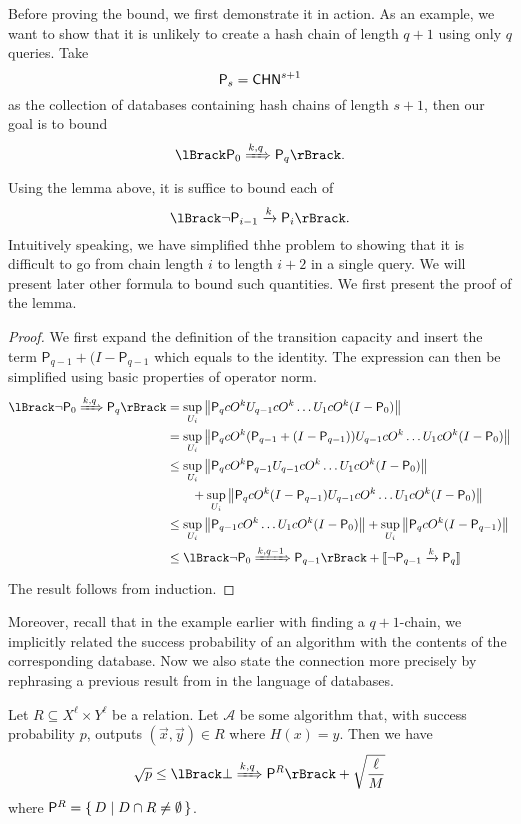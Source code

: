 Before proving the bound, we first demonstrate it in action.
As an example, we want to show that it is unlikely to create a hash chain of length $q+1$ using only $q$ queries.
Take
$$\mathsf{P}_s=\mathsf{CHN}^{s+1}$$
as the collection of databases containing hash chains of length $s+1$,
then our goal is to bound
$$\lBrack\sfP_0\xRightarrow{k,q}\sfP_q\rBrack.$$
Using the lemma above, it is suffice to bound each of
$$\lBrack\neg \sfP_{i-1}\xrightarrow{k}\sfP_i\rBrack.$$
Intuitively speaking, we have simplified thhe problem to showing that it is difficult to go from chain length $i$ to length $i+2$ in a single query.
We will present later other formula to bound such quantities.
We first present the proof of the lemma.

\begin{proof}
	We first expand the definition of the transition capacity and insert the term $\mathsf{P}_{q-1}+(I-\mathsf{P}_{q-1}$ which equals to the identity.
	The expression can then be simplified using basic properties of operator norm.
	\begin{align*}
		\lBrack\neg \mathsf{P}_0\xRightarrow{k,q}\mathsf{P}_q\rBrack
			&=\sup_{U_i}\norm{\mathsf{P}_q cO^k U_{q-1} cO^k\ldots U_1 cO^k (I-\mathsf{P}_0)} \\
			&=\sup_{U_i}\norm{\mathsf{P}_q cO^k (\mathsf{P}_{q-1}+(I-\mathsf{P}_{q-1})) U_{q-1} cO^k\ldots U_1 cO^k (I-\mathsf{P}_0)}\\
			&\leq\sup_{U_i}\norm{\mathsf{P}_q cO^k \mathsf{P}_{q-1} U_{q-1} cO^k\ldots U_1 cO^k (I-\mathsf{P}_0)}\\
			&\qquad+\sup_{U_i}\norm{\mathsf{P}_q cO^k (I-\mathsf{P}_{q-1}) U_{q-1} cO^k\ldots U_1 cO^k (I-\mathsf{P}_0)}\\
			&\leq\sup_{U_i} \norm{\mathsf{P}_{q-1} cO^k\ldots U_1 cO^k (I-\mathsf{P}_0)}+\sup_{U_i} \norm{\mathsf{P}_q cO^k (I-\mathsf{P}_{q-1})}\\
			&\leq\lBrack\neg \mathsf{P}_0\xRightarrow{k,q-1}\mathsf{P}_{q-1}\rBrack+[\![\neg \mathsf{P}_{q-1}\xrightarrow{k}\mathsf{P}_q]\!]
	\end{align*}
	The result follows from induction.
\end{proof}

Moreover, recall that in the example earlier with finding a $q+1$-chain,
we implicitly related the success probability of an algorithm with the contents of the corresponding database.
Now we also state the connection more precisely by rephrasing a previous result from \cite{compressed-oracles} in the language of databases.
\begin{thm}
	Let $R\subseteq X^\ell\times Y^\ell$ be a relation.
	Let $\mathcal{A}$ be some algorithm that, with success probability $p$, outputs $(\vec{x}, \vec{y})\in R$ where $H(x)=y$.
	Then we have
	$$\sqrt{p}\leq\lBrack\bot\xRightarrow{k, q} \mathsf{P}^R\rBrack+\sqrt{\frac{\ell}{M}}$$
	where $\mathsf{P}^R=\set{D | D\cap R\ne\emptyset}$.
\end{thm}

